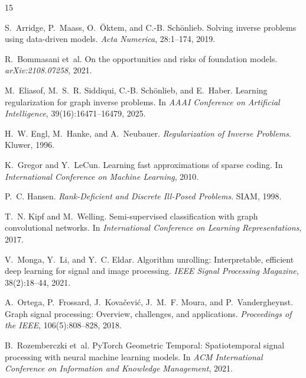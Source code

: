 \documentclass{article}
\begin{document}
\clearpage

\begin{thebibliography}{15}

S.~Arridge, P.~Maass, O.~\"Oktem, and C.-B. Sch\"onlieb.
\newblock Solving inverse problems using data-driven models.
\newblock \emph{Acta Numerica}, 28:1--174, 2019.

R.~Bommasani et~al.
\newblock On the opportunities and risks of foundation models.
\newblock \emph{arXiv:2108.07258}, 2021.

M.~Eliasof, M.~S.~R. Siddiqui, C.-B. Sch\"onlieb, and E.~Haber.
\newblock Learning regularization for graph inverse problems.
\newblock In \emph{AAAI Conference on Artificial Intelligence}, 39(16):16471--16479, 2025.

H.~W. Engl, M.~Hanke, and A.~Neubauer.
\newblock \emph{Regularization of Inverse Problems}.
\newblock Kluwer, 1996.

K.~Gregor and Y.~LeCun.
\newblock Learning fast approximations of sparse coding.
\newblock In \emph{International Conference on Machine Learning}, 2010.

P.~C. Hansen.
\newblock \emph{Rank-Deficient and Discrete Ill-Posed Problems}.
\newblock SIAM, 1998.

T.~N. Kipf and M.~Welling.
\newblock Semi-supervised classification with graph convolutional networks.
\newblock In \emph{International Conference on Learning Representations}, 2017.

V.~Monga, Y.~Li, and Y.~C. Eldar.
\newblock Algorithm unrolling: Interpretable, efficient deep learning for signal and image processing.
\newblock \emph{IEEE Signal Processing Magazine}, 38(2):18--44, 2021.

A.~Ortega, P.~Frossard, J.~Kova\v{c}evi\'c, J.~M.~F. Moura, and P.~Vandergheynst.
\newblock Graph signal processing: Overview, challenges, and applications.
\newblock \emph{Proceedings of the IEEE}, 106(5):808--828, 2018.

B.~Rozemberczki et~al.
\newblock PyTorch Geometric Temporal: Spatiotemporal signal processing with neural machine learning models.
\newblock In \emph{ACM International Conference on Information and Knowledge Management}, 2021.


\end{thebibliography}
\end{document}
